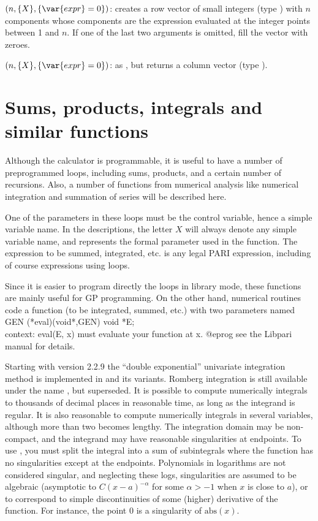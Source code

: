 $(n,\{X\},\{\var{expr}=0\})$: \label{se:vectorsmall}creates a row vector of small integers (type
) with $n$ components whose components are the expression
 evaluated at the integer points between 1 and $n$. If one of the
last two arguments is omitted, fill the vector with zeroes.

$(n,\{X\},\{\var{expr}=0\})$: \label{se:vectorv}as , but returns a column vector (type ).

\section{Sums, products, integrals and similar functions}
\label{se:sums}

Although the  calculator is programmable, it is useful to have
a number of preprogrammed loops, including sums, products, and a certain
number of recursions. Also, a number of functions from numerical analysis
like numerical integration and summation of series will be described here.

One of the parameters in these loops must be the control variable, hence a
simple variable name. In the descriptions, the letter $X$ will always denote
any simple variable name, and represents the formal parameter used in the
function. The expression to be summed, integrated, etc. is any legal PARI
expression, including of course expressions using loops.

Since it is easier to program directly the loops in library mode, these
functions are mainly useful for GP programming. On the other hand, numerical
routines code a function (to be integrated, summed, etc.) with two parameters
named
\bprog
  GEN (*eval)(void*,GEN)
  void *E;  \\ context: eval(E, x) must evaluate your function at x.
@eprog\noindent
see the Libpari manual for details.

Starting with version 2.2.9 the ``double exponential'' univariate
integration method is implemented in  and its variants. Romberg
integration is still available under the name , but
superseded. It is possible to compute numerically integrals to thousands of
decimal places in reasonable time, as long as the integrand is regular. It is
also reasonable to compute numerically integrals in several variables,
although more than two becomes lengthy. The integration domain may be
non-compact, and the integrand may have reasonable singularities at
endpoints. To use , you must split the integral into a sum
of subintegrals where the function has no singularities except at the
endpoints. Polynomials in logarithms are not considered singular, and
neglecting these logs, singularities are assumed to be algebraic (asymptotic
to $C(x-a)^{-\alpha}$ for some $\alpha > -1$ when $x$ is
close to $a$), or to correspond to simple discontinuities of some (higher)
derivative of the function. For instance, the point $0$ is a singularity of
$\text{abs}(x)$.

